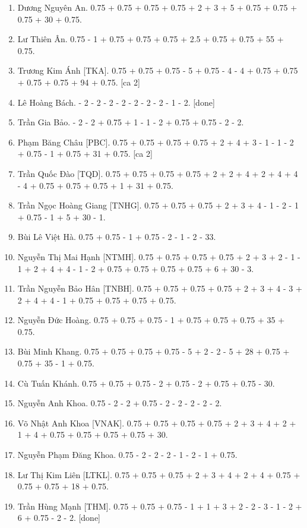 \documentclass{article}
\begin{document}
\begin{enumerate}
	\item {\sc Dương Nguyên An.} 0.75 + 0.75 + 0.75 + 0.75 + 2 + 3 + 5 + 0.75 + 0.75 + 0.75 + 30 + 0.75.
	\item {\sc Lư Thiên Ân.} 0.75 - 1 + 0.75 + 0.75 + 0.75 + 2.5 + 0.75 + 0.75 + 55 + 0.75.
	\item {\sc Trương Kim Ánh [TKA].} 0.75 + 0.75 + 0.75 - 5 + 0.75 - 4 - 4 + 0.75 + 0.75 + 0.75 + 0.75 + 94 + 0.75. [ca 2]
	\item {\sc Lê Hoàng Bách.} - 2 - 2 - 2 - 2 - 2 - 2 - 2 - 1 - 2. [done]
	\item {\sc Trần Gia Bảo.} - 2 - 2 + 0.75 + 1 - 1 - 2 + 0.75 + 0.75 - 2 - 2.
	\item {\sc Phạm Băng Châu [PBC].} 0.75 + 0.75 + 0.75 + 0.75 + 2 + 4 + 3 - 1 - 1 - 2 + 0.75 - 1 + 0.75 + 31 + 0.75. [ca 2]
	\item {\sc Trần Quốc Đào [TQD].} 0.75 + 0.75 + 0.75 + 0.75 + 2 + 2 + 4 + 2 + 4 + 4 - 4 + 0.75 + 0.75 + 0.75 + 1 + 31 + 0.75.
	\item {\sc Trần Ngọc Hoàng Giang [TNHG].} 0.75 + 0.75 + 0.75 + 2 + 3 + 4 - 1 - 2 - 1 + 0.75 - 1 + 5 + 30 - 1.
	\item {\sc Bùi Lê Việt Hà.} 0.75 + 0.75 - 1 + 0.75 - 2 - 1 - 2 - 33.
	\item {\sc Nguyễn Thị Mai Hạnh [NTMH].} 0.75 + 0.75 + 0.75 + 0.75 + 2 + 3 + 2 - 1 - 1 + 2 + 4 + 4 - 1 - 2 + 0.75 + 0.75 + 0.75 + 0.75 + 6 + 30 - 3.
	\item {\sc Trần Nguyễn Bảo Hân [TNBH].} 0.75 + 0.75 + 0.75 + 0.75 + 2 + 3 + 4 - 3 + 2 + 4 + 4 - 1 + 0.75 + 0.75 + 0.75 + 0.75.
	\item {\sc Nguyễn Đức Hoàng.} 0.75 + 0.75 + 0.75 - 1 + 0.75 + 0.75 + 0.75 + 35 + 0.75.
	\item {\sc Bùi Minh Khang.} 0.75 + 0.75 + 0.75 + 0.75 - 5 + 2 - 2 - 5 + 28 + 0.75 + 0.75 + 35 - 1 + 0.75.
	\item {\sc Cù Tuấn Khánh.} 0.75 + 0.75 + 0.75 - 2 + 0.75 - 2 + 0.75 + 0.75 - 30.
	\item {\sc Nguyễn Anh Khoa.} 0.75 - 2 - 2 + 0.75 - 2 - 2 - 2 - 2 - 2.
	\item {\sc Võ Nhật Anh Khoa [VNAK].} 0.75 + 0.75 + 0.75 + 0.75 + 2 + 3 + 4 + 2 + 1 + 4 + 0.75 + 0.75 + 0.75 + 0.75 + 30.
	\item {\sc Nguyễn Phạm Đăng Khoa.} 0.75 - 2 - 2 - 2 - 1 - 2 - 1 + 0.75.
	\item {\sc Lư Thị Kim Liên [LTKL].} 0.75 + 0.75 + 0.75 + 2 + 3 + 4 + 2 + 4 + 0.75 + 0.75 + 0.75 + 18 + 0.75.
	\item {\sc Trần Hùng Mạnh [THM].} 0.75 + 0.75 + 0.75 - 1 + 1 + 3 + 2 - 2 - 3 - 1 - 2 + 6 + 0.75 - 2 - 2. [done]

\end{enumerate}
\end{document}

